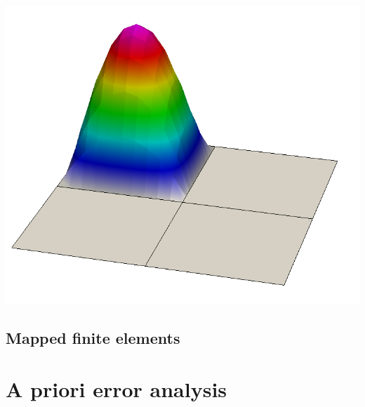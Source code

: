 \documentclass[USEnglish,ignorenonframetext,notheorems,aspectratio=1610]{beamer}
\begin{document}
\begin{frame}
\begin{center}
    \includegraphics[height=.27\textheight]{graph/dgbasis1-22}
  \end{center}
\end{frame}

\subsection{Mapped finite elements}

\frame {}
\frame {}
\frame {}
\frame {}
\frame {}
\frame {}
\frame {}
\frame {}

\section{A priori error analysis}

\frame {}
\frame {}
\frame {}
\frame {}
\frame {
  }
\frame {}
\frame {
  }
\frame {}
\end{document}
